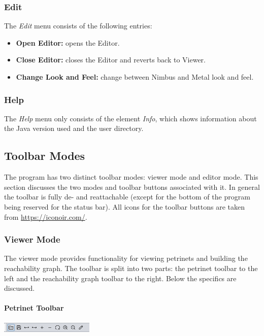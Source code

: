 \documentclass[10pt, a4paper]{article}
\begin{document}
\subsubsection{Edit}


The \textit{Edit} menu consists of the following entries:


\begin{itemize}
\item \textbf{Open Editor:} opens the Editor.
\item \textbf{Close Editor:} closes the Editor and reverts back to Viewer.
\item \textbf{Change Look and Feel:} change between Nimbus and Metal look and feel.
\end{itemize}

\subsubsection{Help}

The \textit{Help} menu only consists of the element \textit{Info}, which shows information about the Java version used and the user directory.

\subsection{Toolbar Modes}

The program has two distinct toolbar modes: viewer mode and editor mode. This section discusses the two modes and toolbar buttons associated with it. In general the toolbar is fully de- and reattachable (except for the bottom of the program being reserved for the status bar). All icons for the toolbar buttons are taken from \url{https://iconoir.com/}.

\subsubsection{Viewer Mode}

The viewer mode provides functionality for viewing petrinets and building the reachability graph. The toolbar is split into two parts: the petrinet toolbar to the left and the reachability graph toolbar to the right. Below the specifics are discussed.

\paragraph{Petrinet Toolbar}

\includegraphics[height=0.5cm]{Viewer_Petrinet_Toolbar.png}
\label{label:viewer}
\end{document}
